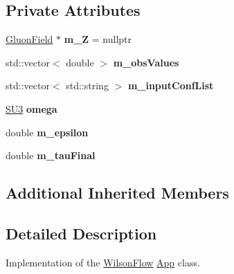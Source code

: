 \subsection*{Private Attributes}
\begin{DoxyCompactItemize}
\item 
\hyperlink{field_8h_afe80b127697eba6d6e7fbd8121c8d4ee}{Gluon\+Field} $\ast$ {\bfseries m\+\_\+Z} = nullptr\hypertarget{classWilsonFlow_ad084fea2d78728ce9f3891c8c6cb475f}{}\label{classWilsonFlow_ad084fea2d78728ce9f3891c8c6cb475f}

\item 
std\+::vector$<$ double $>$ {\bfseries m\+\_\+obs\+Values}\hypertarget{classWilsonFlow_a4c77c1ecf832e6da041ec430cbfec401}{}\label{classWilsonFlow_a4c77c1ecf832e6da041ec430cbfec401}

\item 
std\+::vector$<$ std\+::string $>$ {\bfseries m\+\_\+input\+Conf\+List}\hypertarget{classWilsonFlow_a7dadedd9bdec4647e512248d3627d08c}{}\label{classWilsonFlow_a7dadedd9bdec4647e512248d3627d08c}

\item 
\hyperlink{structSU3}{S\+U3} {\bfseries omega}\hypertarget{classWilsonFlow_a991660c79ba24a305baa7bdf6ea146d8}{}\label{classWilsonFlow_a991660c79ba24a305baa7bdf6ea146d8}

\item 
double {\bfseries m\+\_\+epsilon}\hypertarget{classWilsonFlow_a83a352e3cb1cc2a39d48dd96d8e7e581}{}\label{classWilsonFlow_a83a352e3cb1cc2a39d48dd96d8e7e581}

\item 
double {\bfseries m\+\_\+tau\+Final}\hypertarget{classWilsonFlow_abe5e34f28b9bd915a0a39d44df1d8d4a}{}\label{classWilsonFlow_abe5e34f28b9bd915a0a39d44df1d8d4a}

\end{DoxyCompactItemize}
\subsection*{Additional Inherited Members}


\subsection{Detailed Description}
Implementation of the \hyperlink{classWilsonFlow}{Wilson\+Flow} \hyperlink{classApp}{App} class. 

